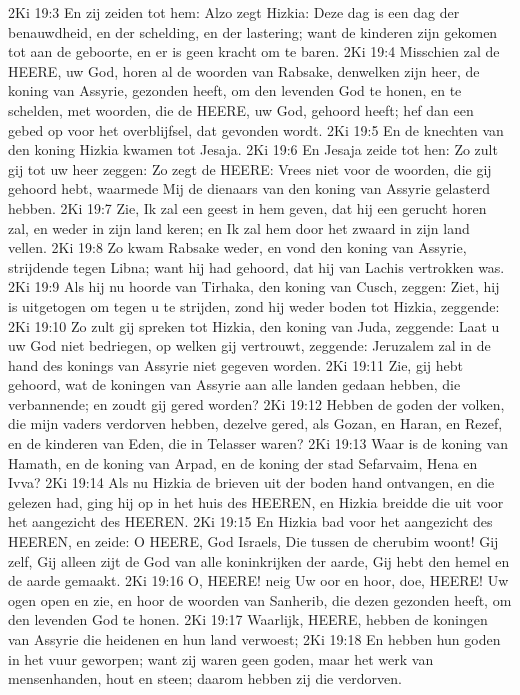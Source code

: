 2Ki 19:3  En zij zeiden tot hem: Alzo zegt Hizkia: Deze dag is een dag der benauwdheid, en der schelding, en der lastering; want de kinderen zijn gekomen tot aan de geboorte, en er is geen kracht om te baren.
2Ki 19:4  Misschien zal de HEERE, uw God, horen al de woorden van Rabsake, denwelken zijn heer, de koning van Assyrie, gezonden heeft, om den levenden God te honen, en te schelden, met woorden, die de HEERE, uw God, gehoord heeft; hef dan een gebed op voor het overblijfsel, dat gevonden wordt.
2Ki 19:5  En de knechten van den koning Hizkia kwamen tot Jesaja.
2Ki 19:6  En Jesaja zeide tot hen: Zo zult gij tot uw heer zeggen: Zo zegt de HEERE: Vrees niet voor de woorden, die gij gehoord hebt, waarmede Mij de dienaars van den koning van Assyrie gelasterd hebben.
2Ki 19:7  Zie, Ik zal een geest in hem geven, dat hij een gerucht horen zal, en weder in zijn land keren; en Ik zal hem door het zwaard in zijn land vellen.
2Ki 19:8  Zo kwam Rabsake weder, en vond den koning van Assyrie, strijdende tegen Libna; want hij had gehoord, dat hij van Lachis vertrokken was.
2Ki 19:9  Als hij nu hoorde van Tirhaka, den koning van Cusch, zeggen: Ziet, hij is uitgetogen om tegen u te strijden, zond hij weder boden tot Hizkia, zeggende:
2Ki 19:10  Zo zult gij spreken tot Hizkia, den koning van Juda, zeggende: Laat u uw God niet bedriegen, op welken gij vertrouwt, zeggende: Jeruzalem zal in de hand des konings van Assyrie niet gegeven worden.
2Ki 19:11  Zie, gij hebt gehoord, wat de koningen van Assyrie aan alle landen gedaan hebben, die verbannende; en zoudt gij gered worden?
2Ki 19:12  Hebben de goden der volken, die mijn vaders verdorven hebben, dezelve gered, als Gozan, en Haran, en Rezef, en de kinderen van Eden, die in Telasser waren?
2Ki 19:13  Waar is de koning van Hamath, en de koning van Arpad, en de koning der stad Sefarvaim, Hena en Ivva?
2Ki 19:14  Als nu Hizkia de brieven uit der boden hand ontvangen, en die gelezen had, ging hij op in het huis des HEEREN, en Hizkia breidde die uit voor het aangezicht des HEEREN.
2Ki 19:15  En Hizkia bad voor het aangezicht des HEEREN, en zeide: O HEERE, God Israels, Die tussen de cherubim woont! Gij zelf, Gij alleen zijt de God van alle koninkrijken der aarde, Gij hebt den hemel en de aarde gemaakt.
2Ki 19:16  O, HEERE! neig Uw oor en hoor, doe, HEERE! Uw ogen open en zie, en hoor de woorden van Sanherib, die dezen gezonden heeft, om den levenden God te honen.
2Ki 19:17  Waarlijk, HEERE, hebben de koningen van Assyrie die heidenen en hun land verwoest;
2Ki 19:18  En hebben hun goden in het vuur geworpen; want zij waren geen goden, maar het werk van mensenhanden, hout en steen; daarom hebben zij die verdorven.
